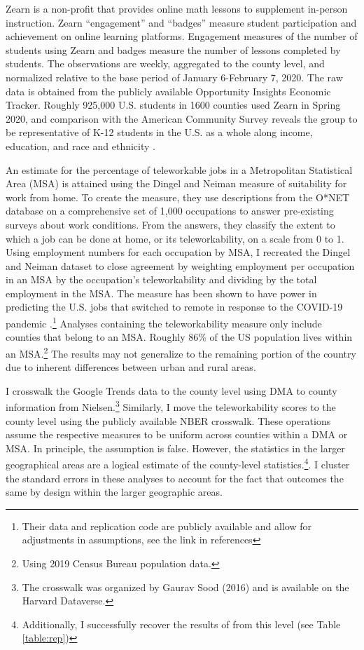 	Zearn is a non-profit that provides online math lessons to supplement in-person instruction.
        Zearn “engagement” and “badges” measure student participation and achievement on online learning platforms.
        Engagement measures of the number of students using Zearn and badges measure the number of lessons completed by students.
        The observations are weekly, aggregated to the county level, and normalized relative to the base period of January 6-February 7, 2020.
        The raw data is obtained from the publicly available Opportunity Insights Economic Tracker.
        Roughly 925,000 U.S. students in 1600 counties used Zearn in Spring 2020, and comparison with the American Community Survey reveals the group to be representative of K-12 students in the U.S. as a whole along income, education, and race and ethnicity \citep{chetty}.
        \par
An estimate for the percentage of teleworkable jobs in a Metropolitan Statistical Area (MSA) is attained using the Dingel and Neiman measure of suitability for work from home.
To create the measure, they use descriptions from the O*NET database on a comprehensive set of 1,000 occupations to answer pre-existing surveys about work conditions.
From the answers, they classify the extent to which a job can be done at home, or its teleworkability, on a scale from 0 to 1.
Using employment numbers for each occupation by MSA, I recreated the Dingel and Neiman dataset to close agreement by weighting employment per occupation in an MSA by the occupation’s teleworkability and dividing by the total employment in the MSA.
The \cite{dingel} measure has been shown to have power in predicting the U.S. jobs that switched to remote in response to the COVID-19 pandemic \citep{blandin, bartik}.\footnote{Their data and replication code are publicly available and allow for adjustments in assumptions, see the link in references} Analyses containing the teleworkability measure only include counties that belong to an MSA.
Roughly 86\% of the US population lives within an MSA.\footnote{Using 2019 Census Bureau population data.} The results may not generalize to the remaining portion of the country due to inherent differences between urban and rural areas.
\par
I crosswalk the Google Trends data to the county level using DMA to county information from Nielsen.\footnote{The crosswalk was organized by Gaurav Sood (2016) and is available on the Harvard Dataverse.} Similarly, I move the teleworkability scores to the county level using the publicly available NBER crosswalk.
These operations assume the respective measures to be uniform across counties within a DMA or MSA.
In principle, the assumption is false.
However, the statistics in the larger geographical areas are a logical estimate of the county-level statistics.\footnote{Additionally, I successfully recover the results of \cite{bh1} from this level (see Table \ref{table:rep})}.
I cluster the standard errors in these analyses to account for the fact that outcomes the same by design within the larger geographic areas.
